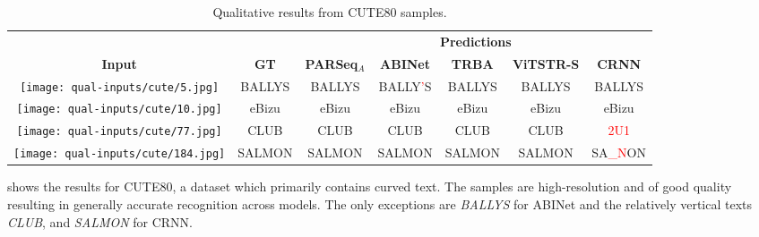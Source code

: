 \begin{table*}[htbp]
\newcommand{\customsize}{\scriptsize}
  \footnotesize
  \centering
  \setlength\tabcolsep{2pt}
  \caption{Qualitative results from CUTE80 samples.}
  \begin{tabular}{ c c c c c c c }
    \toprule
    & & \multicolumn{5}{c}{\textbf{Predictions}} \\
    \cmidrule{3-7}
    \textbf{Input} & \textbf{GT} & \textbf{PARSeq$_A$} & \textbf{ABINet} & \textbf{TRBA} & \textbf{ViTSTR-S} & \textbf{CRNN} \\
    \midrule
    \texttt{[image: qual-inputs/cute/5.jpg]} & BALLYS & BALLYS & BALLY\textcolor{red}{'}S & BALLYS & BALLYS & BALLYS \\
    \texttt{[image: qual-inputs/cute/10.jpg]} & eBizu & eBizu & eBizu & eBizu & eBizu & eBizu \\
    \texttt{[image: qual-inputs/cute/77.jpg]} & CLUB & CLUB & CLUB & CLUB & CLUB & \textcolor{red}{2U1} \\
\texttt{[image: qual-inputs/cute/184.jpg]} & SALMON & SALMON & SALMON & SALMON & SALMON & SA\textcolor{red}{\_N}ON \\
    \bottomrule
  \end{tabular}
  \label{tab:qual-results-cute}
\end{table*}


 shows the results for CUTE80, a dataset which primarily contains curved text. The samples are high-resolution and of good quality resulting in generally accurate recognition across models. The only exceptions are \textit{BALLYS} for ABINet and the relatively vertical texts \textit{CLUB}, and \textit{SALMON} for CRNN.


